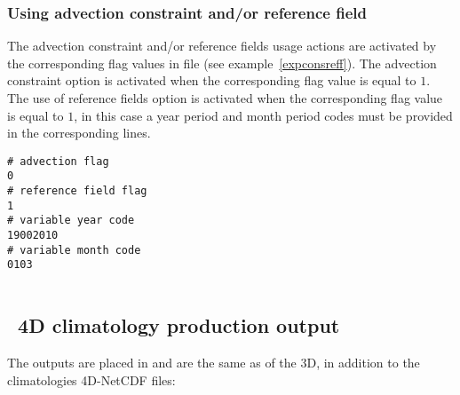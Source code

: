 \subsubsection{Using advection constraint and/or reference field }

The advection constraint and/or reference fields usage actions are activated by the corresponding flag values in  file (see example~\ref{expconsreff}).
The advection constraint option is activated when the corresponding flag value is equal to $1$. 
The use of reference fields option is activated when the corresponding flag value is equal to $1$, in this case a year period  and month period codes must be provided in the corresponding lines.


\begin{center}
\begin{exfile}[H] %
\begin{footnotesize}
\begin{verbatim}
# advection flag
0
# reference field flag
1
# variable year code
19002010
# variable month code
0103
\end{verbatim}
\end{footnotesize}
\caption{}
\label{varlistexp}
\end{exfile}
\end{center}

\begin{tabular}{|l|}
\hline
\hline
\end{tabular}

\pagebreak

\subsection{\diva\ 4D climatology production output}

The outputs are placed in  and are the same as of the \diva 3D, in addition to the climatologies 4D-NetCDF files:

